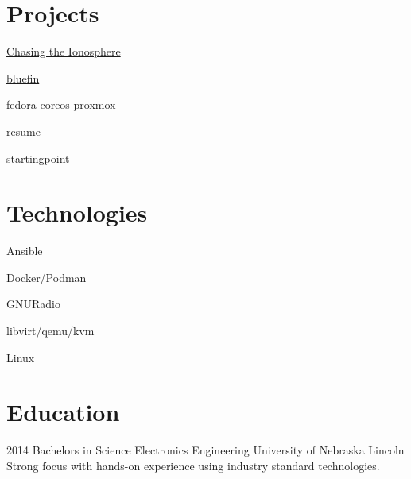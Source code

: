 \documentclass[]{src/friggeri-cv}
\begin{document}
\begin{aside}
  \section{Projects}
    \item[\rightarrow]\href{https://www.northropgrumman.com/space/chasing-the-ionosphere}{Chasing the Ionosphere}
    \item[\rightarrow]\href{https://github.com/bpbeatty/bluefin}{bluefin}
    \item[\rightarrow]\href{https://github.com/bpbeatty/fedora-coreos-proxmox}{fedora-coreos-proxmox}
    \item[\rightarrow]\href{https://github.com/bpbeatty/resume}{resume}
    \item[\rightarrow]\href{https://github.com/bpbeatty/startingpoint}{startingpoint}
    ~
  \section{Technologies}
    \item[\rightarrow]{Ansible}
    \item[\rightarrow]{Docker/Podman}
    \item[\rightarrow]{GNURadio}
    \item[\rightarrow]{libvirt/qemu/kvm}
    \item[\rightarrow]{Linux}
    ~
\end{aside}

\section{Education}
\begin{entrylist}
  \entry
    {2014}
    {Bachelors in Science Electronics Engineering}
    {University of Nebraska Lincoln}
    {Strong focus with hands-on experience using industry standard technologies.}
\end{entrylist}
\end{document}
